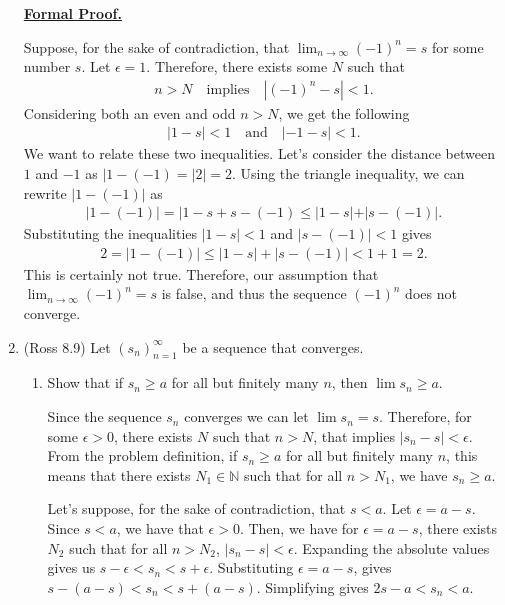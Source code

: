 \documentclass [10pt]{article}
\newcommand{\jg}[1]{{\color{blue} #1}}
\begin{document}
\begin{enumerate}
{\textbf{\underline{Formal Proof.}}

Suppose, for the sake of contradiction, that $\lim_{n \to \infty} (-1)^n = s$ for some number $s$. Let $\epsilon = 1$. Therefore, there exists some $N$ such that 
\begin{align*}
    n > N \quad \text{implies} \quad |(-1)^n - s| < 1.
\end{align*}
Considering both an even and odd $n > N$, we get the following 
\begin{align*}
    |1-s| < 1 \quad \text{and} \quad |-1 - s | < 1. 
\end{align*}
We want to relate these two inequalities. Let's consider the distance between $1$ and $-1$ as $|1-(-1) = |2| = 2$. Using the triangle inequality, we can rewrite $|1-(-1)|$ as 
\begin{align*}
    |1-(-1)| = |1-s + s - (-1) \leq |1-s| + |s - (-1)|.
\end{align*}
Substituting the inequalities $|1-s| < 1$ and $|s - (-1)| < 1$ gives 
\begin{align*}
    2 = |1-(-1)| \leq |1-s| + |s-(-1)| < 1 + 1 = 2. 
\end{align*}
This is certainly not true. Therefore, our assumption that $\lim_{n \to \infty} (-1)^n = s$ is false, and thus the sequence $(-1)^n$ does not converge. 
}
\clearpage

\item (Ross 8.9)
Let $(s_n)_{n=1}^{\infty}$ be a sequence that converges.
\begin{enumerate}
\item Show that if $s_n \geq a$ for all but finitely many $n$, then $\lim s_n \geq a$.

\jg{
Since the sequence $s_n$ converges we can let $\lim s_n = s$. Therefore, for some $\epsilon > 0$, there exists $N$ such that $n > N$, that implies $|s_n - s| < \epsilon$. From the problem definition, if $s_n \geq a$ for all but finitely many $n$, this means that there exists $N_1 \in \mathbb{N}$ such that for all $n > N_1$, we have $s_n \geq a$. 

Let's suppose, for the sake of contradiction, that $s < a$. Let $\epsilon = a - s$. Since $s < a$, we have that $\epsilon > 0$. Then, we have for $\epsilon = a - s$, there exists $N_2$ such that for all $n > N_2$, $|s_n - s | < \epsilon$. Expanding the absolute values gives us $s - \epsilon < s_n < s + \epsilon$. Substituting $\epsilon = a - s$, gives $s - (a - s) < s_n < s + (a - s)$. Simplifying gives $2s - a < s_n < a$. 

}
\end{enumerate}
\end{enumerate}
\end{document}
